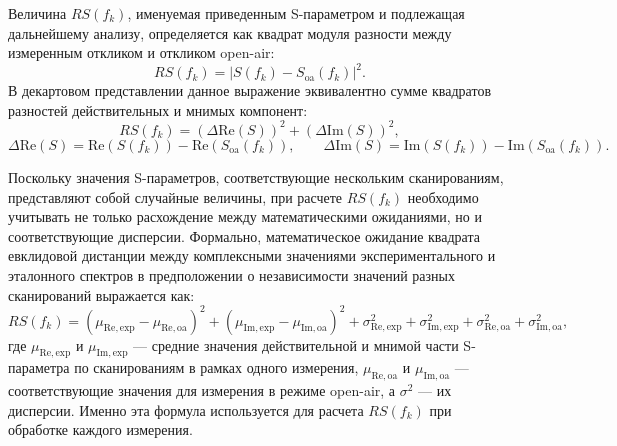 Величина $RS(f_k)$, именуемая приведенным S-параметром и подлежащая дальнейшему анализу, определяется как квадрат модуля разности между измеренным откликом и откликом open-air:
\begin{equation}
    RS(f_k) = |S(f_k) - S_{\mathrm{oa}}(f_k)|^2.
\end{equation}
В декартовом представлении данное выражение эквивалентно сумме квадратов разностей действительных и мнимых компонент:
\begin{equation}
    RS(f_k) = (\Delta \mathrm{Re}(S))^2 + (\Delta \mathrm{Im}(S))^2,
\end{equation}
\begin{equation}
    \Delta \mathrm{Re}(S) = \mathrm{Re}(S(f_k)) - \mathrm{Re}(S_{\mathrm{oa}}(f_k)), \qquad
    \Delta \mathrm{Im}(S) = \mathrm{Im}(S(f_k)) - \mathrm{Im}(S_{\mathrm{oa}}(f_k)).
\end{equation}

Поскольку значения S-параметров, соответствующие нескольким сканированиям, представляют собой случайные величины, при расчете $RS(f_k)$ необходимо учитывать не только расхождение между математическими ожиданиями, но и соответствующие дисперсии. Формально, математическое ожидание квадрата евклидовой дистанции между комплексными значениями экспериментального и эталонного спектров в предположении о независимости значений разных сканирований выражается как:
\begin{equation}
    RS(f_k) =
    (\mu_{\mathrm{Re},\mathrm{exp}} - \mu_{\mathrm{Re},\mathrm{oa}})^2
    + (\mu_{\mathrm{Im},\mathrm{exp}} - \mu_{\mathrm{Im},\mathrm{oa}})^2
    + \sigma_{\mathrm{Re},\mathrm{exp}}^2
    + \sigma_{\mathrm{Im},\mathrm{exp}}^2
    + \sigma_{\mathrm{Re},\mathrm{oa}}^2
    + \sigma_{\mathrm{Im},\mathrm{oa}}^2,
\end{equation}
где $\mu_{\mathrm{Re},\mathrm{exp}}$ и $\mu_{\mathrm{Im},\mathrm{exp}}$ --- средние значения действительной и мнимой части S-параметра по сканированиям в рамках одного измерения, $\mu_{\mathrm{Re},\mathrm{oa}}$ и $\mu_{\mathrm{Im},\mathrm{oa}}$ --- соответствующие значения для измерения в режиме open-air, а $\sigma^2$ --- их дисперсии. Именно эта формула используется для расчета $RS(f_k)$ при обработке каждого измерения.
